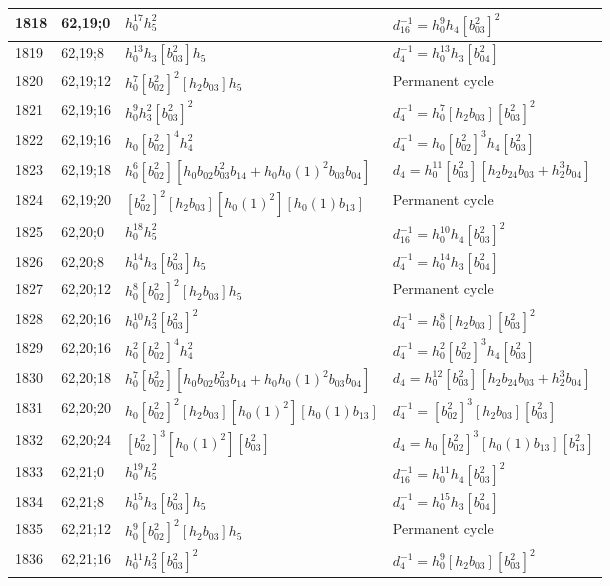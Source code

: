 \documentclass{article}
\begin{document}
\begin{longtable}{|l|l|>{\raggedright\arraybackslash}p{6cm}|>{\raggedright\arraybackslash}p{6cm}|}
\hline
1818 & 62,19;0 & $h_0^{17}h_5^2$ & $d_{16}^{-1}=h_0^9h_4[b_{03}^2]^2$\\
\hline
1819 & 62,19;8 & $h_0^{13}h_3[b_{03}^2]h_5$ & $d_{4}^{-1}=h_0^{13}h_3[b_{04}^2]$\\
\hline
1820 & 62,19;12 & $h_0^7[b_{02}^2]^2[h_2b_{03}]h_5$ & Permanent cycle\\
\hline
1821 & 62,19;16 & $h_0^9h_3^2[b_{03}^2]^2$ & $d_{4}^{-1}=h_0^7[h_2b_{03}][b_{03}^2]^2$\\
1822 & 62,19;16 & $h_0[b_{02}^2]^4h_4^2$ & $d_{4}^{-1}=h_0[b_{02}^2]^3h_4[b_{03}^2]$\\
\hline
1823 & 62,19;18 & $h_0^6[b_{02}^2][h_0b_{02}b_{03}^2b_{14} + h_0h_0(1)^2b_{03}b_{04}]$ &$d_{4}=h_0^{11}[b_{03}^2][h_2b_{24}b_{03} + h_2^3b_{04}]$\\
\hline
1824 & 62,19;20 & $[b_{02}^2]^2[h_2b_{03}][h_0(1)^2][h_0(1)b_{13}]$ & Permanent cycle\\
\hline
1825 & 62,20;0 & $h_0^{18}h_5^2$ & $d_{16}^{-1}=h_0^{10}h_4[b_{03}^2]^2$\\
\hline
1826 & 62,20;8 & $h_0^{14}h_3[b_{03}^2]h_5$ & $d_{4}^{-1}=h_0^{14}h_3[b_{04}^2]$\\
\hline
1827 & 62,20;12 & $h_0^8[b_{02}^2]^2[h_2b_{03}]h_5$ & Permanent cycle\\
\hline
1828 & 62,20;16 & $h_0^{10}h_3^2[b_{03}^2]^2$ & $d_{4}^{-1}=h_0^8[h_2b_{03}][b_{03}^2]^2$\\
1829 & 62,20;16 & $h_0^2[b_{02}^2]^4h_4^2$ & $d_{4}^{-1}=h_0^2[b_{02}^2]^3h_4[b_{03}^2]$\\
\hline
1830 & 62,20;18 & $h_0^7[b_{02}^2][h_0b_{02}b_{03}^2b_{14} + h_0h_0(1)^2b_{03}b_{04}]$ &$d_{4}=h_0^{12}[b_{03}^2][h_2b_{24}b_{03} + h_2^3b_{04}]$\\
\hline
1831 & 62,20;20 & $h_0[b_{02}^2]^2[h_2b_{03}][h_0(1)^2][h_0(1)b_{13}]$ & $d_{4}^{-1}=[b_{02}^2]^3[h_2b_{03}][b_{03}^2]$\\
\hline
1832 & 62,20;24 & $[b_{02}^2]^3[h_0(1)^2][b_{03}^2]$ &$d_{4}=h_0[b_{02}^2]^3[h_0(1)b_{13}][b_{13}^2]$\\
\hline
1833 & 62,21;0 & $h_0^{19}h_5^2$ & $d_{16}^{-1}=h_0^{11}h_4[b_{03}^2]^2$\\
\hline
1834 & 62,21;8 & $h_0^{15}h_3[b_{03}^2]h_5$ & $d_{4}^{-1}=h_0^{15}h_3[b_{04}^2]$\\
\hline
1835 & 62,21;12 & $h_0^9[b_{02}^2]^2[h_2b_{03}]h_5$ & Permanent cycle\\
\hline
1836 & 62,21;16 & $h_0^{11}h_3^2[b_{03}^2]^2$ & $d_{4}^{-1}=h_0^9[h_2b_{03}][b_{03}^2]^2$\\

\end{longtable}
\end{document}
